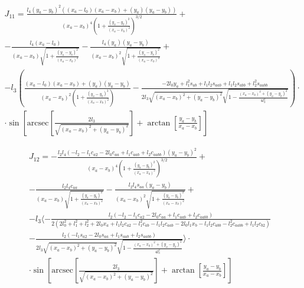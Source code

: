 \documentclass[printmode]{mgr}
\begin{document}
\begin{multline*}
J_{11} = 
\frac{l_4 (y_a - y_b)^2 ((x_a - l_0) (x_a - x_b)+(y_a) (y_a - y_b))}{(x_a - x_b)^4 \left(1+\frac{(y_a - y_b)^2}{(x_a - x_b)^2}\right)^{3/2}}+\\
-\frac{l_4 (x_a - l_0)}{(x_a - x_b) \sqrt{1+\frac{(y_a - y_b)^2}{(x_a - x_b)^2}}}-\frac{l_4 (y_a) (y_a - y_b)}{(x_a - x_b)^2 \sqrt{1+\frac{(y_a - y_b)^2}{(x_a - x_b)^2}}}+\\
-l_3\left(\frac{(x_a - l_0) (x_a - x_b)+(y_a) (y_a - y_b)}{(x_a - x_b)^2 \left(1+\frac{(y_a - y_b)^2}{(x_a - x_b)^2}\right)} -
\frac{-2 l_0 y_a+l_1^2 s_{ab}+l_1 l_2 s_{aab}+l_1 l_2 s_{abb}+l_2^2 s_{aabb}}{2 l_3 \sqrt{(x_a - x_b)^2+(y_a - y_b)^2} \sqrt{1-\frac{(x_a - x_b)^2+(y_a - y_b)^2}{4 l_3^2}}}\right) \cdot\\ \cdot \sin\left[\text{arcsec}\left[\frac{2 l_3}{\sqrt{(x_a - x_b)^2+(y_a - y_b)^2}}\right]+\arctan\left[\frac{y_a - y_b}{x_a - x_b}\right]\right] 
\end{multline*}

\begin{multline*}
J_{12} = 
 -\frac{l_2 l_4 (-l_2-l_1 c_{a2}-2 l_0 c_{aa}+l_1 c_{aab}+l_2 c_{aabb}) (y_a - y_b)^2}{(x_a - x_b)^4 \left(1+\frac{(y_a - y_b)^2}{(x_a - x_b)^2}\right)^{3/2}}+\\
 -\frac{l_2 l_4 c_{aa}}{(x_a - x_b) \sqrt{1+\frac{(y_a - y_b)^2}{(x_a - x_b)^2}}}-\frac{l_2 l_4 s_{aa} (y_a - y_b)}{(x_a - x_b)^2 \sqrt{1+\frac{(y_a - y_b)^2}{(x_a - x_b)^2}}}+
 \\
 -l_3 \langle-\frac{l_2 (-l_2-l_1 c_{a2}-2 l_0 c_{aa}+l_1 c_{aab}+l_2 c_{aabb})}{2 \left(2 l_0^2+l_1^2+l_2^2+2 l_0 x_a+l_1 l_2 c_{a2}-l_1^2 c_{ab}-l_1 l_2 c_{aab}-2 l_0 l_1 x_b-l_1 l_2 c_{abb}-l_2^2 c_{aabb}+l_1 l_2 c_{b2}\right)}
 \\
 -\frac{l_2 (-l_1 s_{a2}-2 l_0 s_{aa}+l_1 s_{aab}+l_2 s_{aabb})}{2 l_3 \sqrt{(x_a - x_b)^2+(y_a - y_b)^2} \sqrt{1-\frac{(x_a - x_b)^2+(y_a - y_b)^2}{4 l_3^2}}}\rangle \cdot 
 \\ \cdot \sin\left[\text{arcsec}\left[\frac{2 l_3}{\sqrt{(x_a - x_b)^2+(y_a - y_b)^2}}\right]+\arctan\left[\frac{y_a - y_b}{x_a - x_b}\right]\right] 
\end{multline*}
\end{document}
